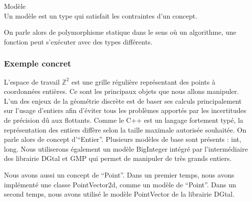 \begin{Definition}{Modèle}\\
  Un modèle est un type qui satisfait les contraintes d'un concept.
\label{def:cpp-mod}

\end{Definition}

On parle alors de polymorphisme statique dans le sens où un algorithme, une fonction peut s'exécuter avec des types différents.

\subsubsection{Exemple concret}


L'espace de travail $\mathbb{Z}^{2}$ est une grille régulière représentant des points à coordonnées entières. Ce sont les principaux objets que nous allons manipuler. L'un des enjeux de la géométrie discrète est de baser ses calculs principalement sur l'usage d'entiers afin d'éviter tous les problèmes apportés par les incertitudes de précision dû aux flottants. Comme le C++ est un langage fortement typé, la représentation des entiers diffère selon la taille maximale autorisée souhaitée. On parle alors de concept d'``Entier''. Plusieurs modèles de base sont présents : int, long. Nous utiliserons également un modèle BigInteger intégré par l'intermédiaire des librairie DGtal et GMP qui permet de manipuler de très grands entiers.

Nous avons aussi un concept de ``Point''. Dans un premier temps, nous avons implémenté une classe PointVector2d, comme un modèle de ``Point''. Dans un second temps, nous avons utilisé le modèle PointVector de la librairie DGtal.  


